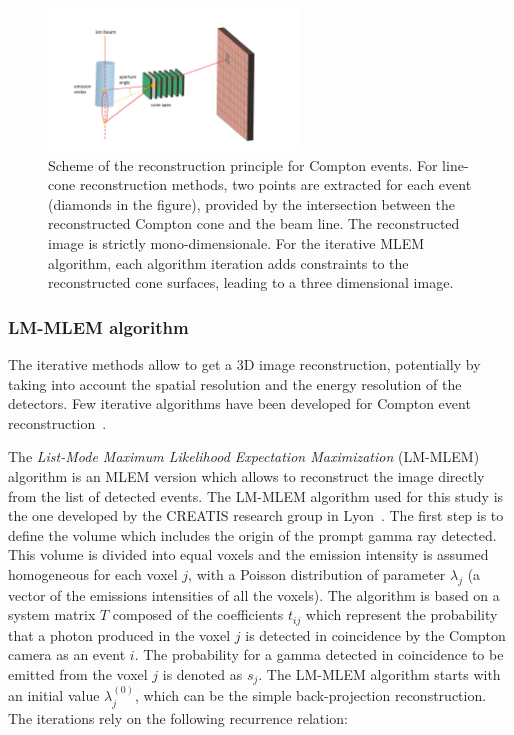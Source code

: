 \begin{figure}
\centering
  \includegraphics[width=0.6\textwidth]{./Figure/reconstruction_scheme}
  \caption{Scheme of the reconstruction principle for Compton events. For line-cone reconstruction methods, two points are extracted for each event (diamonds in the figure), provided by the intersection between the reconstructed Compton cone and the beam line. The reconstructed image is strictly mono-dimensionale. For the iterative MLEM algorithm, each algorithm iteration adds constraints to the reconstructed cone surfaces, leading to  a three dimensional image.}	
  \label{fig:reconstruction_scheme}
\end{figure}

\subsubsection{LM-MLEM algorithm}	
The iterative methods allow to get a 3D image reconstruction, potentially by taking into account the spatial resolution and the energy resolution of the detectors. Few iterative algorithms have been developed for Compton event reconstruction~\cite{schone_common_2010, zoglauer_design_2011,gillam_compton_2011,mackin_evaluation_2012,lojacono_low_2013}.

The \textit{List-Mode Maximum Likelihood Expectation Maximization} (LM-MLEM) algorithm is an MLEM version which allows to reconstruct the image directly from the list of detected events.
The LM-MLEM algorithm used for this study is the one developed by the CREATIS research group in Lyon~\cite{maxim_filtered_2014,hilaire_compton_2014}.\newline%
The first step is to define the volume which includes the origin of the prompt gamma ray detected. This volume is divided into equal voxels and the emission intensity is assumed homogeneous for each voxel $j$, with a Poisson distribution of parameter $\lambda_j$ (a vector of the emissions intensities of all the voxels). The algorithm is based on a system matrix $T$ composed of the coefficients  $t_{ij}$ which represent the probability that a photon produced in the voxel $j$ is detected in coincidence by the Compton camera as an event $i$. The probability for a gamma detected in coincidence to be emitted from the voxel $j$ is denoted as $s_j$.
The LM-MLEM algorithm starts with an initial value $\lambda^{(0)}_j$, which can be the simple back-projection reconstruction.
The iterations rely on the following recurrence relation:

